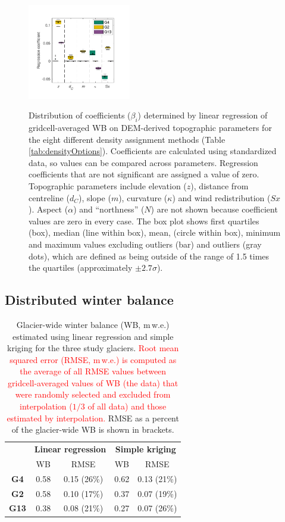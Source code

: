 \documentclass[review,oneside, letterpaper]{igs}
\begin{document}
\begin{figure}
	\centering
	\includegraphics[width =0.4\textwidth]{BetaCoeffs.pdf}\\
	\caption{Distribution of coefficients ($\beta_i$) determined by linear regression of gridcell-averaged WB on DEM-derived topographic parameters for the eight different density assignment methods (Table \ref{tab:densityOptions}). Coefficients are calculated using standardized data, so values can be compared across parameters. Regression coefficients that are not significant are assigned a value of zero. Topographic parameters include elevation ($z$), distance from centreline ($d_C$), slope ($m$), curvature ($\kappa$) and wind redistribution ($Sx$).  Aspect ($\alpha$) and ``northness'' ($N$) are not shown because coefficient values are zero in every case. The box plot shows first quartiles (box), median (line within box), mean, (circle within box), minimum and maximum values excluding outliers (bar) and outliers (gray dots), which are defined as being outside of the range of 1.5 times the quartiles (approximately $\pm2.7\sigma$). }
	\label{fig:BetaCoeffs}
\end{figure}


\subsection{Distributed winter balance}
 
 \begin{table}[]
\centering
\caption{Glacier-wide winter balance (WB, m\,w.e.) estimated using linear regression and simple kriging for the three study glaciers. \textcolor{red}{Root mean squared error (RMSE, m\,w.e.) is computed as the average of all RMSE values between gridcell-averaged values of WB (the data) that were randomly selected and excluded from interpolation ($1/3$ of all data) and those estimated by interpolation.} RMSE as a percent of the glacier-wide WB is shown in brackets.}
\label{tab:WSMB&RMSE}
\begin{tabular}{c|cc|cc}
 & \multicolumn{2}{c|}{\textbf{Linear regression}} & \multicolumn{2}{c}{\textbf{Simple kriging}} \\
 & WB & RMSE & WB & RMSE \\ \hline
\textbf{G4} & 0.58 & 0.15 (26\%) & 0.62 & 0.13 (21\%) \\
\textbf{G2} & 0.58 & 0.10 (17\%) & 0.37 & 0.07 (19\%) \\
\textbf{G13} & 0.38 & 0.08 (21\%) & 0.27 & 0.07 (26\%)
\end{tabular}
\end{table}
\end{document}
